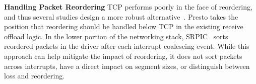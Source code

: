 {\bf Handling Packet Reordering}
TCP performs poorly in the face of reordering, and thus several studies
design a more robust alternative~\cite{rr-tcp,blanton2002making,tcp-pr}.
Presto takes the position that reordering should be handled below TCP in the existing 
receive offload logic.
In the lower portion of the networking stack, SRPIC~\cite{wu2009sorting} sorts reordered packets 
in the driver after each interrupt coalescing event. While this approach can help
mitigate the impact of reordering, it does not sort packets across interrupts, have a 
direct impact on segment sizes, or distinguish between loss and reordering. 


